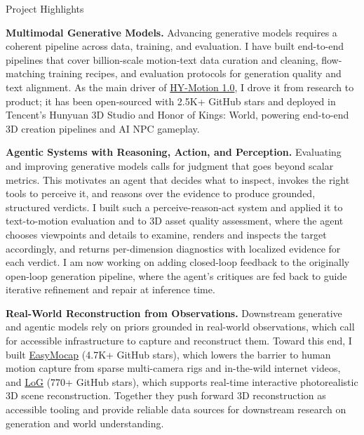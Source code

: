 \documentclass{resume}
\begin{document}
\begin{rSection}{Project Highlights}

    {\bf Multimodal Generative Models.} Advancing generative models requires a coherent pipeline across data, training, and evaluation. I have built end-to-end pipelines that cover billion-scale motion-text data curation and cleaning, flow-matching training recipes, and evaluation protocols for generation quality and text alignment. As the main driver of \href{https://github.com/Tencent-Hunyuan/HY-Motion-1.0}{HY-Motion 1.0}, I drove it from research to product; it has been open-sourced with 2.5K+ GitHub stars and deployed in Tencent's Hunyuan 3D Studio and Honor of Kings: World, powering end-to-end 3D creation pipelines and AI NPC gameplay.

    {\bf Agentic Systems with Reasoning, Action, and Perception.} Evaluating and improving generative models calls for judgment that goes beyond scalar metrics. This motivates an agent that decides what to inspect, invokes the right tools to perceive it, and reasons over the evidence to produce grounded, structured verdicts. I built such a perceive-reason-act system and applied it to text-to-motion evaluation and to 3D asset quality assessment, where the agent chooses viewpoints and details to examine, renders and inspects the target accordingly, and returns per-dimension diagnostics with localized evidence for each verdict. I am now working on adding closed-loop feedback to the originally open-loop generation pipeline, where the agent's critiques are fed back to guide iterative refinement and repair at inference time.

    {\bf Real-World Reconstruction from Observations.} Downstream generative and agentic models rely on priors grounded in real-world observations, which call for accessible infrastructure to capture and reconstruct them. Toward this end, I built \href{https://github.com/zju3dv/EasyMocap}{EasyMocap} (4.7K+ GitHub stars), which lowers the barrier to human motion capture from sparse multi-camera rigs and in-the-wild internet videos, and \href{https://github.com/zju3dv/LoG}{LoG} (770+ GitHub stars), which supports real-time interactive photorealistic 3D scene reconstruction. Together they push forward 3D reconstruction as accessible tooling and provide reliable data sources for downstream research on generation and world understanding.

\end{rSection}
\end{document}
